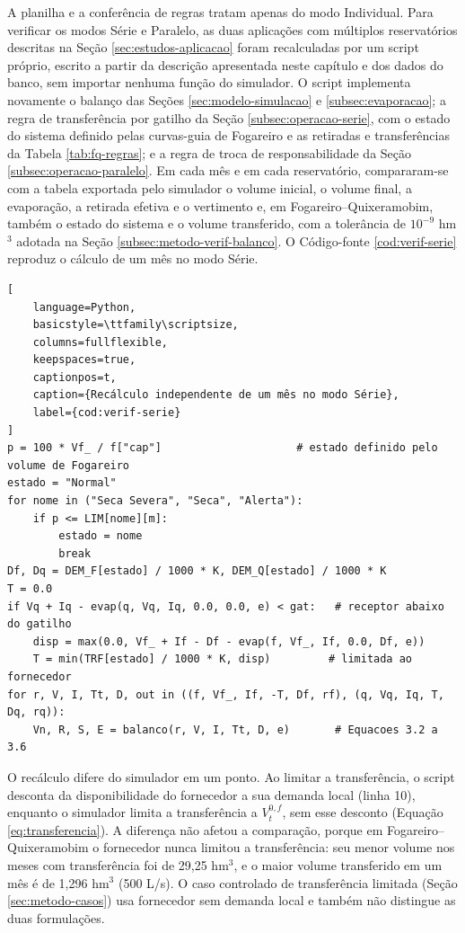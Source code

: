 A planilha e a conferência de regras tratam apenas do modo Individual. Para verificar os modos Série e Paralelo, as duas aplicações com múltiplos reservatórios descritas na Seção \ref{sec:estudos-aplicacao} foram recalculadas por um script próprio, escrito a partir da descrição apresentada neste capítulo e dos dados do banco, sem importar nenhuma função do simulador. O script implementa novamente o balanço das Seções \ref{sec:modelo-simulacao} e \ref{subsec:evaporacao}; a regra de transferência por gatilho da Seção \ref{subsec:operacao-serie}, com o estado do sistema definido pelas curvas-guia de Fogareiro e as retiradas e transferências da Tabela \ref{tab:fq-regras}; e a regra de troca de responsabilidade da Seção \ref{subsec:operacao-paralelo}. Em cada mês e em cada reservatório, compararam-se com a tabela exportada pelo simulador o volume inicial, o volume final, a evaporação, a retirada efetiva e o vertimento e, em Fogareiro--Quixeramobim, também o estado do sistema e o volume transferido, com a tolerância de $10^{-9}$ hm$^3$ adotada na Seção \ref{subsec:metodo-verif-balanco}. O Código-fonte \ref{cod:verif-serie} reproduz o cálculo de um mês no modo Série.

\noindent\begin{minipage}{\linewidth}
\begin{lstlisting}[
    language=Python,
    basicstyle=\ttfamily\scriptsize,
    columns=fullflexible,
    keepspaces=true,
    captionpos=t,
    caption={Recálculo independente de um mês no modo Série},
    label={cod:verif-serie}
]
p = 100 * Vf_ / f["cap"]                     # estado definido pelo volume de Fogareiro
estado = "Normal"
for nome in ("Seca Severa", "Seca", "Alerta"):
    if p <= LIM[nome][m]:
        estado = nome
        break
Df, Dq = DEM_F[estado] / 1000 * K, DEM_Q[estado] / 1000 * K
T = 0.0
if Vq + Iq - evap(q, Vq, Iq, 0.0, 0.0, e) < gat:   # receptor abaixo do gatilho
    disp = max(0.0, Vf_ + If - Df - evap(f, Vf_, If, 0.0, Df, e))
    T = min(TRF[estado] / 1000 * K, disp)         # limitada ao fornecedor
for r, V, I, Tt, D, out in ((f, Vf_, If, -T, Df, rf), (q, Vq, Iq, T, Dq, rq)):
    Vn, R, S, E = balanco(r, V, I, Tt, D, e)       # Equacoes 3.2 a 3.6
\end{lstlisting}
\end{minipage}
\par\medskip

O recálculo difere do simulador em um ponto. Ao limitar a transferência, o script desconta da disponibilidade do fornecedor a sua demanda local (linha 10), enquanto o simulador limita a transferência a $V^{0,f}_t$, sem esse desconto (Equação \ref{eq:transferencia}). A diferença não afetou a comparação, porque em Fogareiro--Quixeramobim o fornecedor nunca limitou a transferência: seu menor volume nos meses com transferência foi de 29,25 hm$^3$, e o maior volume transferido em um mês é de 1,296 hm$^3$ (500 L/s). O caso controlado de transferência limitada (Seção \ref{sec:metodo-casos}) usa fornecedor sem demanda local e também não distingue as duas formulações.


